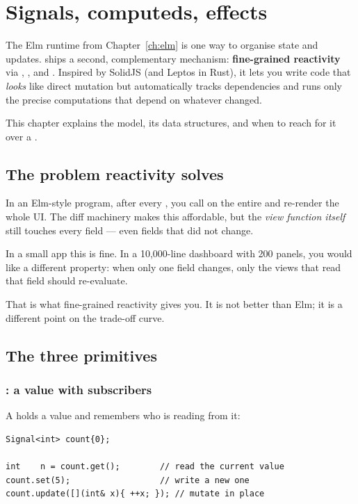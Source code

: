 \chapter{Signals, computeds, effects}
\label{ch:signals}

The Elm runtime from Chapter~\ref{ch:elm} is one way to organise
state and updates. \maya{} ships a second, complementary mechanism:
\textbf{fine-grained reactivity} via ,
, and . Inspired by SolidJS (and
Leptos in Rust), it lets you write code that \emph{looks} like
direct mutation but automatically tracks dependencies and runs only
the precise computations that depend on whatever changed.

This chapter explains the model, its data structures, and when to
reach for it over a .

\section{The problem reactivity solves}

In an Elm-style program, after every , you call 
on the entire  and re-render the whole UI. The diff
machinery makes this affordable, but the \emph{view function itself}
still touches every field --- even fields that did not change.

In a small app this is fine. In a 10,000-line dashboard with 200
panels, you would like a different property: when only one field
changes, only the views that read that field should re-evaluate.

That is what fine-grained reactivity gives you. It is not better
than Elm; it is a different point on the trade-off curve.

\section{The three primitives}

\subsection{: a value with subscribers}

A  holds a value and remembers who is reading from
it:

\begin{lstlisting}
Signal<int> count{0};

int    n = count.get();        // read the current value
count.set(5);                  // write a new one
count.update([](int& x){ ++x; }); // mutate in place
\end{lstlisting}

